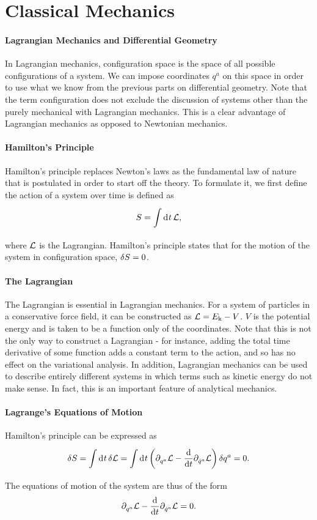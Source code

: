 \section{Classical Mechanics}

\paragraph{Lagrangian Mechanics and Differential Geometry}
In Lagrangian mechanics, configuration space is the space of all possible configurations of a system. We can impose coordinates $q^{a}$ on this space in order to use what we know from the previous parts on differential geometry. Note that the term configuration does not exclude the discussion of systems other than the purely mechanical with Lagrangian mechanics. This is a clear advantage of Lagrangian mechanics as opposed to Newtonian mechanics.

\paragraph{Hamilton's Principle}
Hamilton's principle replaces Newton's laws as the fundamental law of nature that is postulated in order to start off the theory. To formulate it, we first define the action of a system over time is defined as
\begin{align*}
	S = \int\limits_{}^{}\dd[]{t}\mathcal{L},
\end{align*}
where $\mathcal{L}$ is the Lagrangian. Hamilton's principle states that for the motion of the system in configuration space, $\var{S} = 0$.

\paragraph{The Lagrangian}
The Lagrangian is essential in Lagrangian mechanics. For a system of particles in a conservative force field, it can be constructed as $\mathcal{L} = E_{\text{k}} - V$. $V$ is the potential energy and is taken to be a function only of the coordinates. Note that this is not the only way to construct a Lagrangian - for instance, adding the total time derivative of some function adds a constant term to the action, and so has no effect on the variational analysis. In addition, Lagrangian mechanics can be used to describe entirely different systems in which terms such as kinetic energy do not make sense. In fact, this is an important feature of analytical mechanics.

\paragraph{Lagrange's Equations of Motion}
Hamilton's principle can be expressed as
\begin{align*}
	\var{S} = \int\limits_{}^{}\dd[]{t}\var{\ensuremath{\mathcal{L}}} = \int\limits_{}^{}\dd[]{t}\left(\partial^{}_{q^{a}}\mathcal{L} - \dv{t}\partial^{}_{\dot{q}^{a}}\mathcal{L}\right)\var{q^{a}} = 0.
\end{align*}
The equations of motion of the system are thus of the form
\begin{align*}
	\partial^{}_{q^{a}}\mathcal{L} - \dv{t}\partial^{}_{\dot{q}^{a}}\mathcal{L} = 0.
\end{align*}

